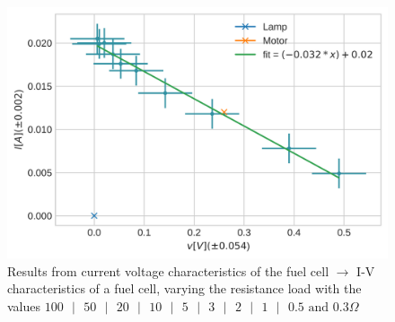 \documentclass{article}
\begin{document}
    \begin{figure}
        \centering
        \includegraphics[scale=0.9]{./threepluslamp.png}
        \caption{Results from current voltage characteristics of the fuel cell \(\rightarrow\) I-V characteristics of a fuel cell, varying the resistance load with the values \(100 \text{ } \vert \text{ } 50 \text{ } \vert \text{ } 20 \text{ } \vert \text{ } 10 \text{ } \vert \text{ } 5 \text{ } \vert \text{ } 3 \text{ } \vert \text{ } 2 \text{ } \vert \text{ } 1 \text{ } \vert \text{ } 0.5 \text{ and } 0.3 \Omega\)}
    \end{figure}
\end{document}
